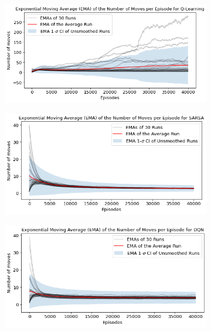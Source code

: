 \documentclass[conference]{IEEEtran}
\begin{document}
\begin{figure}[htbp!]
    \centering
    \begin{subfigure}[]{.45\textwidth}
        \includegraphics[width=\textwidth]{../figures/n_moves_30_runs_qlearning.png}
        \caption{}
    \end{subfigure}
    \begin{subfigure}[]{.45\textwidth}
        \includegraphics[width=\textwidth]{../figures/n_moves_30_runs_sarsa.png}
        \caption{}
    \end{subfigure}
    \begin{subfigure}[]{.45\textwidth}
        \includegraphics[width=\textwidth]{../figures/n_moves_30_runs_dqn.png}
        \caption{}
    \end{subfigure}
    \caption{}
    \label{fig:30runs_n_moves}
\end{figure}



\end{document}
